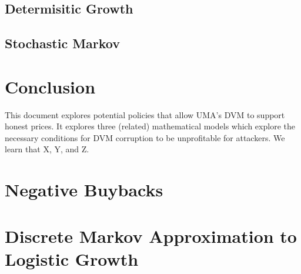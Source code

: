 \documentclass[12pt]{article}
\begin{document}
  \subsection{Determisitic Growth} \label{sec:dg}
    

  \subsection{Stochastic Markov} \label{sec:sm}
    

\section{Conclusion}

This document explores potential policies that allow UMA's DVM to support honest prices. It explores
three (related) mathematical models which explore the necessary conditions for DVM corruption to be
unprofitable for attackers. We learn that X, Y, and Z.


\appendix

\section{Negative Buybacks} \label{app:nbb}
  

\section{Discrete Markov Approximation to Logistic Growth} \label{app:dmc}
  
\end{document}
